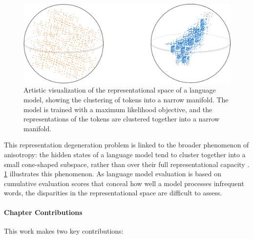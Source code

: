 \begin{figure}[ht!]
    \centering
    \includegraphics[width=0.8\linewidth]{chapters/syntatic-smoothing/figures/anisotropy_visualization.pdf}
    \caption{Artistic visualization of the representational space of a language model, showing the clustering of tokens into a narrow manifold. The model is trained with a maximum likelihood objective, and the representations of the tokens are clustered together into a narrow manifold.}
    \label{fig:anisotropy_visualization}
\end{figure}

\newpage

This representation degeneration problem is linked to the broader phenomenon of anisotropy: the hidden states of a language model tend to cluster together into a small cone-shaped subspace, rather than over their full representational capacity \citep{arora2016latent, ethayarajh2019contextual, gao2018representation}. \cref{fig:anisotropy_visualization} illustrates this phenomenon. As language model evaluation is based on cumulative evaluation scores that conceal how well a model processes infrequent words, the disparities in the representational space are difficult to assess. 

\paragraph{Chapter Contributions} This work makes two key contributions:

